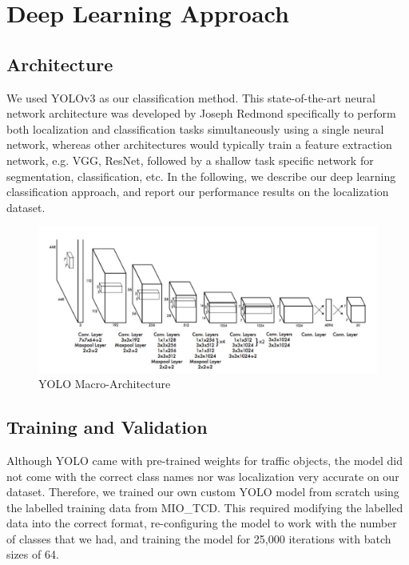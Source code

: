 \documentclass[12pt]{article}
\begin{document}
\section{Deep Learning Approach}

\subsection{Architecture}

We used YOLOv3 \cite{Darknet13} as our classification method. This state-of-the-art neural network architecture was developed by Joseph Redmond specifically to perform both localization and classification tasks simultaneously using a single neural network, whereas other architectures would typically train a feature extraction network, e.g. VGG, ResNet, followed by a shallow task specific network for segmentation, classification, etc. In the following, we describe our deep learning classification approach, and report our performance results on the localization dataset.

\begin{figure}[!htb]
\includegraphics[width=\linewidth]{Darknet_Architecture.png}
\caption{YOLO Macro-Architecture}
\label{fig:darknet}
\end{figure}

\subsection{Training and Validation}

Although YOLO came with pre-trained weights for traffic objects, the model did not come with the correct class names nor was localization very accurate on our dataset. Therefore, we trained our own custom YOLO model from scratch using the labelled training data from MIO\_TCD. This required modifying the labelled data into the correct format, re-configuring the model to work with the number of classes that we had, and training the model for 25,000 iterations with batch sizes of 64.
\end{document}
